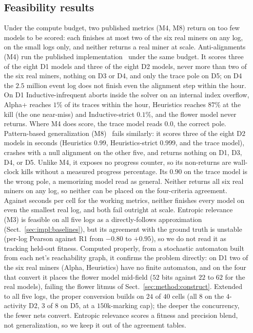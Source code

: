 \documentclass[runningheads]{llncs}
\newcommand{\chg}[1]{\textcolor{chgblue}{#1}}
\begin{document}
\subsection{Feasibility results}
\label{sec:eval:feasibility}
\chg{Under the compute budget, two published metrics (M4, M8) return on too few models to be scored: each finishes at most two of the six real miners on any log, on the small logs only, and neither returns a real miner at scale. Anti-alignments (M4) run the published implementation~\cite{vandongen2016anti} under the same budget. It scores three of the eight D1 models and three of the eight D2 models, never more than two of the six real miners, nothing on D3 or D4, and only the trace pole on D5; on D4 the $2.5$ million event log does not finish even the alignment step within the hour. On D1 Inductive-infrequent aborts inside the solver on an internal index overflow, Alpha+ reaches $1\%$ of its traces within the hour, \chg{Heuristics reaches $87\%$ at the kill (the one near-miss) and Inductive-strict $0.1\%$,} and the flower model never returns. Where M4 does score, the trace model reads $0.0$, the correct pole. Pattern-based generalization (M8)~\cite{reissner2022pattern} fails similarly: it scores three of the eight D2 models in seconds (Heuristics $0.99$, Heuristics-strict $0.999$, and the trace model), crashes with a null alignment on the other five, and returns nothing on D1, D3, D4, or D5. \chg{Unlike M4, it exposes no progress counter, so its non-returns are wall-clock kills without a measured progress percentage.} Its $0.90$ on the trace model is the wrong pole, a memorizing model read as general. Neither returns all six real miners on any log, so neither can be placed on the four-criteria agreement. Against seconds per cell for the working metrics, neither finishes every model on even the smallest real log, and both fail outright at scale.} \chg{Entropic relevance (M3) is feasible on all five logs as a directly-follows approximation (Sect.~\ref{sec:impl:baselines}), but its agreement with the ground truth is unstable (per-log Pearson against R1 from $-0.80$ to $+0.95$), so we do not read it as tracking held-out fitness. Computed properly, from a stochastic automaton built from each net's reachability graph, it confirms the problem directly: on D1 two of the six real miners (Alpha, Heuristics) have no finite automaton, and on the four that convert it places the flower model mid-field ($52$ bits against $22$ to $62$ for the real models), failing the flower litmus of Sect.~\ref{sec:method:construct}. Extended to all five logs, the proper conversion builds on $24$ of $40$ cells (all $8$ on the $4$-activity D2, $3$ of $8$ on D5, at a $150$k-marking cap); the deeper the concurrency, the fewer nets convert. Entropic relevance scores a fitness and precision blend, not generalization, so we keep it out of the agreement tables.}
\end{document}
